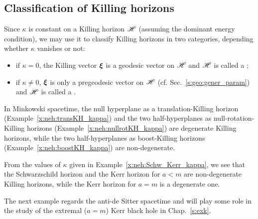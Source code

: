 \subsection{Classification of Killing horizons} \label{s:neh:classif_KH}

Since $\kappa$ is constant on a Killing horizon $\mathscr{H}$ (assuming the dominant
energy condition), we may use it to classify Killing horizons in two
categories, depending whether $\kappa$ vanishes or not:
\begin{itemize}
\item if $\kappa = 0$, the Killing vector $\bm{\xi}$ is a geodesic vector on $\mathscr{H}$
and $\mathscr{H}$ is called a ;
\item if $\kappa \not=0$, $\bm{\xi}$ is only a pregeodesic vector on $\mathscr{H}$
(cf. Sec.~\ref{s:geo:gener_param})
and $\mathscr{H}$ is called a .
\end{itemize}

\begin{example}
In Minkowski spacetime, the null hyperplane as a translation-Killing horizon
(Example~\ref{x:neh:transKH_kappa}) and the two half-hyperplanes as
null-rotation-Killing horizons (Example~\ref{x:neh:nullrotKH_kappa}) are
degenerate Killing horizons, while the two half-hyperplanes as
boost-Killing horizons (Example~\ref{x:neh:boostKH_kappa}) are non-degenerate.
\end{example}

\begin{example}
From the values of $\kappa$ given in Example~\ref{x:neh:Schw_Kerr_kappa},
we see that the Schwarzschild horizon and the Kerr horizon for
$a<m$ are non-degenerate Killing horizons, while the Kerr horizon for
$a=m$ is a degenerate one.
\end{example}

The next example regards the anti-de Sitter spacetime and will play some
role in the study of the extremal ($a=m$) Kerr black hole in Chap.~\ref{s:exk}.

